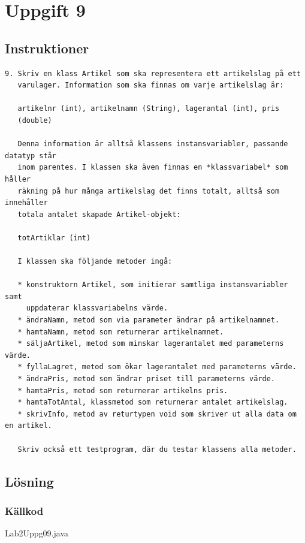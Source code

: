 \section{Uppgift 9}\label{sec:uppg09}

\subsection{Instruktioner}
\begin{verbatim}
9. Skriv en klass Artikel som ska representera ett artikelslag på ett
   varulager. Information som ska finnas om varje artikelslag är:

   artikelnr (int), artikelnamn (String), lagerantal (int), pris
   (double)

   Denna information är alltså klassens instansvariabler, passande datatyp står
   inom parentes. I klassen ska även finnas en *klassvariabel* som håller
   räkning på hur många artikelslag det finns totalt, alltså som innehåller
   totala antalet skapade Artikel-objekt:

   totArtiklar (int)

   I klassen ska följande metoder ingå:

   * konstruktorn Artikel, som initierar samtliga instansvariabler samt
     uppdaterar klassvariabelns värde.
   * ändraNamn, metod som via parameter ändrar på artikelnamnet.
   * hamtaNamn, metod som returnerar artikelnamnet.
   * säljaArtikel, metod som minskar lagerantalet med parameterns värde.
   * fyllaLagret, metod som ökar lagerantalet med parameterns värde.
   * ändraPris, metod som ändrar priset till parameterns värde.
   * hamtaPris, metod som returnerar artikelns pris.
   * hamtaTotAntal, klassmetod som returnerar antalet artikelslag.
   * skrivInfo, metod av returtypen void som skriver ut alla data om en artikel.

   Skriv också ett testprogram, där du testar klassens alla metoder.
\end{verbatim}


\subsection{Lösning}

\subsubsection{Källkod}
\caption{Lab2Uppg09.java}
\label{src:uppg09}


